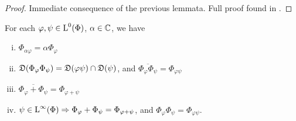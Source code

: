 \begin{proof}
  Immediate consequence of the previous lemmata. Full proof
  found in \cite{LesHaupt}.
% 

\end{proof}

\begin{lem} 
\label{maintheorem4}
  
 For each $\varphi, \psi \in {\text{L}^0}(\Phi)$, $\alpha \in \mathbb{C}$, we have

\begin{enumerate}[(i)]
  \item $\Phi_{\alpha \varphi} = \alpha \Phi_\varphi$
  \item $\mathfrak{D}(\Phi_\varphi \Phi_\psi) = \mathfrak{D}(\varphi \psi) \cap \mathfrak{D}(\psi)$, and 
  $\overline{\Phi_\varphi \Phi_\psi} = \Phi_{\varphi \psi}$
  \item $ \overline{\Phi_\varphi + \Phi_\psi} = \Phi_{\varphi + \psi}$
  \item $\psi \in {\text{L}^\infty }(\Phi) \Rightarrow \Phi_\varphi + \Phi_\psi =
  \Phi_{\varphi+\psi}$, and $\Phi_\varphi \Phi_\psi = \Phi_{\varphi \psi}$.
\end{enumerate}

  
\end{lem}

